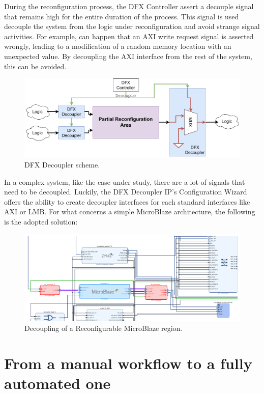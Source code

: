 During the reconfiguration process, the DFX Controller assert a decouple signal that remains high for the entire duration of the process. This signal is used decouple the system from the logic under reconfiguration and avoid strange signal activities. For example, can happen that an AXI write request signal is asserted wrongly, leading to a modification of a random memory location with an unexpected value. By decoupling the AXI interface from the rest of the system, this can be avoided. 

\begin{figure}[H]
\centering
\includegraphics[width=0.95\linewidth]{images/chapter4/dfx_dec.pdf}
\caption{DFX Decoupler scheme.}
\end{figure}

In a complex system, like the case under study, there are a lot of signals that need to be decoupled. Luckily, the DFX Decoupler IP's Configuration Wizard offers the ability to create decoupler interfaces for each standard interfaces like AXI or LMB. For what concerns a simple MicroBlaze architecture, the following is the adopted solution:

\begin{figure}[H]
\centering
\includegraphics[width=0.95\linewidth]{images/chapter4/dec_mb-cropped.pdf}
\caption{Decoupling of a Reconfigurable MicroBlaze region.}
\end{figure}

\section{From a manual workflow to a fully automated one}

